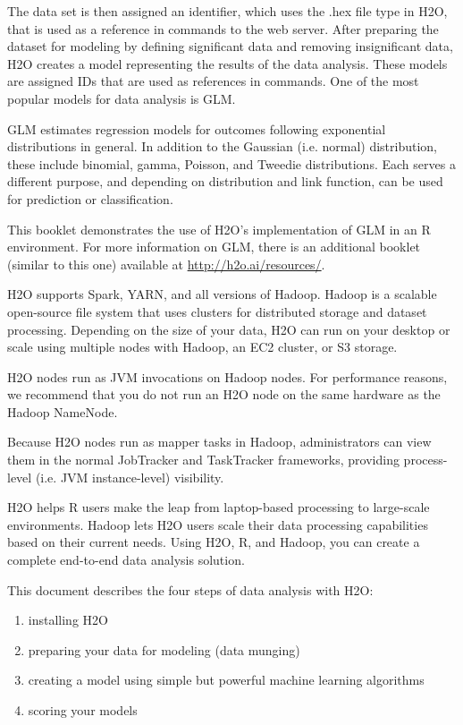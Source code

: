 {The data set is then assigned an identifier, which uses the .hex file type in H2O, that is used as a reference in  commands to the web server. After preparing the dataset for modeling by defining significant data and removing insignificant data, H2O creates a model representing the results of the data analysis. These models are assigned IDs that are used as references in commands. One of the most popular models for data analysis is GLM. 

GLM estimates regression models for outcomes following exponential distributions in general. In addition to the Gaussian (i.e. normal) distribution, these include binomial, gamma, Poisson, and Tweedie distributions. Each serves a different purpose, and depending on distribution and link function, can be used for prediction or classification.

This booklet demonstrates the use of H2O's implementation of GLM in an R environment. For more information on GLM, there is an additional booklet (similar to this one) available at {\url{http://h2o.ai/resources/}}. 

H2O supports Spark, YARN, and all versions of Hadoop. Hadoop is a scalable open-source file system that uses clusters for distributed storage and dataset processing. Depending on the size of your data, H2O can run on your desktop or scale using multiple nodes with Hadoop, an EC2 cluster, or S3 storage. 

H2O nodes run as JVM invocations on Hadoop nodes. For performance reasons, we recommend that you do not run an H2O node on the same hardware as the Hadoop NameNode.

Because H2O nodes run as mapper tasks in Hadoop, administrators can view them in the normal JobTracker and TaskTracker frameworks, providing process-level (i.e. JVM instance-level) visibility.

H2O helps R users make the leap from laptop-based processing to large-scale environments. Hadoop lets H2O users scale their data processing capabilities based on their current needs. Using H2O, R, and Hadoop, you can create a complete end-to-end data analysis solution. 

This document describes the four steps of data analysis with H2O: 
\begin{enumerate}

\item installing H2O
\item preparing your data for modeling (data munging)
\item creating a model using simple but powerful machine learning algorithms
\item scoring your models


\end{enumerate}}
